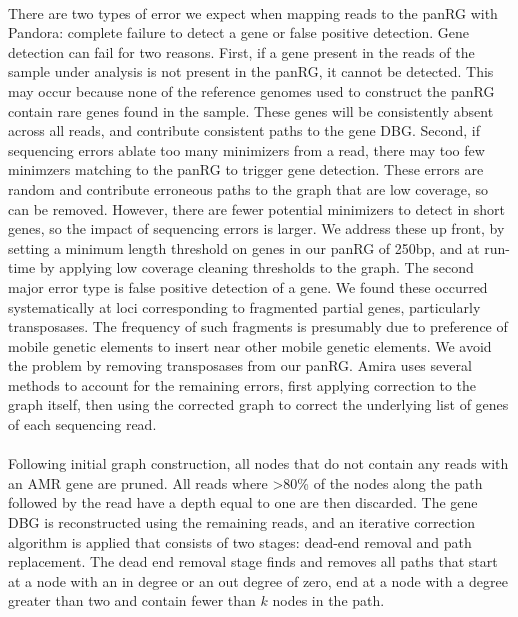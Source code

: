 \paragraph{}
There are two types of error we expect when mapping reads to the panRG with Pandora: complete failure to detect a gene or false positive detection. Gene detection can fail for two reasons. First, if a gene present in the reads of the sample under analysis is not present in the panRG, it cannot be detected. This may occur because none of the reference genomes used to construct the panRG contain rare genes found in the sample. These genes will be consistently absent across all reads, and contribute consistent paths to the gene DBG. Second, if sequencing errors ablate too many minimizers from a read, there may too few minimzers matching to the panRG to trigger gene detection. These errors are random and contribute erroneous paths to the graph that are low coverage, so can be removed. However, there are fewer potential minimizers to detect in short genes, so the impact of sequencing errors is larger. We address these up front, by setting a minimum length threshold on genes in our panRG of 250bp, and at run-time by applying low coverage cleaning thresholds to the graph. The second major error type is false positive detection of a gene. We found these occurred systematically at loci corresponding to fragmented partial genes, particularly transposases. The frequency of such fragments is presumably due to preference of mobile genetic elements to insert near other mobile genetic elements. We avoid the problem by removing transposases from our panRG. Amira uses several methods to account for the remaining errors, first applying correction to the graph itself, then using the corrected graph to correct the underlying list of genes of each sequencing read.
\paragraph{}
Following initial graph construction, all nodes that do not contain any reads with an AMR gene are pruned. All reads where >80\% of the nodes along the path followed by the read have a depth equal to one are then discarded. The gene DBG is reconstructed using the remaining reads, and an iterative correction algorithm is applied that consists of two stages: dead-end removal and path replacement. The dead end removal stage finds and removes all paths that start at a node with an in degree or an out degree of zero, end at a node with a degree greater than two and contain fewer than $k$ nodes in the path.
